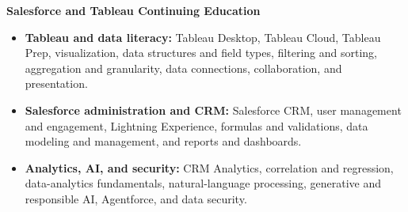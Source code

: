\smallskip
\textbf{Salesforce and Tableau Continuing Education}\par
{}
\begin{itemize}
  \item \textbf{Tableau and data literacy:} Tableau Desktop, Tableau Cloud, Tableau Prep, visualization, data structures and field types, filtering and sorting, aggregation and granularity, data connections, collaboration, and presentation.
  \item \textbf{Salesforce administration and CRM:} Salesforce CRM, user management and engagement, Lightning Experience, formulas and validations, data modeling and management, and reports and dashboards.
  \item \textbf{Analytics, AI, and security:} CRM Analytics, correlation and regression, data-analytics fundamentals, natural-language processing, generative and responsible AI, Agentforce, and data security.
\end{itemize}
